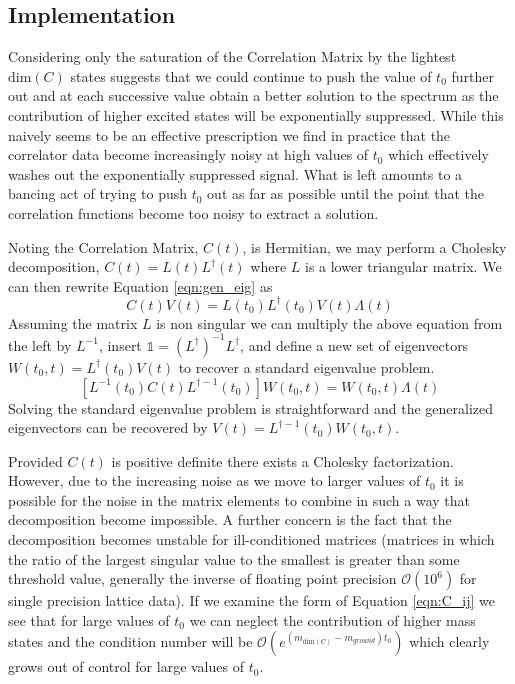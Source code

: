 
\subsection{Implementation}

Considering only the saturation of the Correlation Matrix by the lightest $\mathrm{dim}(C)$ states suggests that we could continue to push the value of $t_0$ further out and at each successive value obtain a better solution to the spectrum as the contribution of higher excited states will be exponentially suppressed. While this naively seems to be an effective prescription we find in practice that the correlator data become increasingly noisy at high values of $t_0$ which effectively washes out the exponentially suppressed signal.  What is left amounts to a bancing act of trying to push $t_0$ out as far as possible until the point that the correlation functions become too noisy to extract a solution. 
\par
Noting the Correlation Matrix, $C(t)$, is Hermitian, we may perform a Cholesky decomposition, $C(t) = L(t)L^{\dagger}(t)$ where $L$ is a lower triangular matrix. We can then rewrite Equation \ref{eqn:gen_eig} as
\begin{equation*}
C(t)V(t) = L(t_0)L^{\dagger}(t_0)V(t)\Lambda(t)
\end{equation*}
Assuming the matrix $L$ is non singular we can multiply the above equation from the left by $L^{-1}$, insert $\mathbb{1} = (L^{\dagger})^{-1}L^{\dagger}$, and define a new set of eigenvectors $W(t_0,t) = L^{\dagger}(t_0)V(t)$ to recover a standard eigenvalue problem.
\begin{equation*}
\left[L^{-1}(t_0)C(t)L^{\dagger-1}(t_0)\right]W(t_0,t) = W(t_0,t)\Lambda(t)
\end{equation*}
Solving the standard eigenvalue problem is straightforward and the generalized eigenvectors can be recovered by $V(t) = L^{\dagger-1}(t_0)W(t_0,t)$.
\par
Provided $C(t)$ is positive definite there exists a Cholesky factorization.  However, due to the increasing noise as we move to larger values of $t_0$ it is possible for the noise in the matrix elements to combine in such a way that decomposition become impossible.  A further concern is the fact that the decomposition becomes unstable for ill-conditioned matrices (matrices in which the ratio of the largest singular value to the smallest is greater than some threshold value, generally the inverse of floating point precision $\mathcal{O}(10^6)$ for single precision lattice data).  If we examine the form of Equation \ref{eqn:C_ij} we see that for large values of $t_0$ we can neglect the contribution of higher mass states and the condition number will be $\mathcal{O}(e^{(m_{\mathrm{dim}(C)} - m_{ground})t_0})$ which clearly grows out of control for large values of $t_0$.
